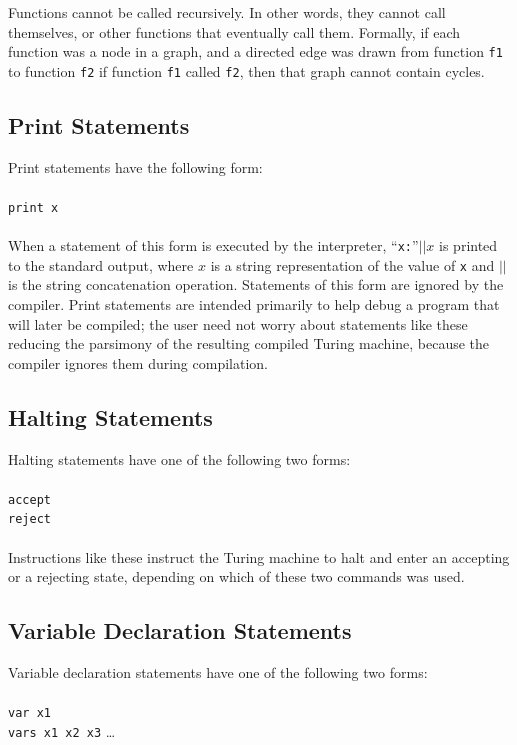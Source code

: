 \documentclass[11pt]{report}
\begin{document}
Functions cannot be called recursively. In other words, they cannot call themselves, or other functions that eventually call them. Formally, if each function was a node in a graph, and a directed edge was drawn from function \texttt{f1} to function \texttt{f2} if function \texttt{f1} called \texttt{f2}, then that graph cannot contain cycles.

\subsection{Print Statements}

Print statements have the following form: \\ \\ 
\texttt{print x} \\ \\ 
When a statement of this form is executed by the interpreter, ``\texttt{x:}''$|| x$ is printed to the standard output, where $x$ is a string representation of the value of \texttt{x} and $||$ is the string concatenation operation. Statements of this form are ignored by the compiler. Print statements are intended primarily to help debug a program that will later be compiled; the user need not worry about statements like these reducing the parsimony of the resulting compiled Turing machine, because the compiler ignores them during compilation.

\subsection{Halting Statements}

Halting statements have one of the following two forms: \\ \\
\texttt{accept} \\
\texttt{reject} \\ \\

Instructions like these instruct the Turing machine to halt and enter an accepting or a rejecting state, depending on which of these two commands was used. 

\subsection{Variable Declaration Statements}

Variable declaration statements have one of the following two forms: \\ \\
\texttt{var x1} \\
\texttt{vars x1 x2 x3} \dots \\
\end{document}
